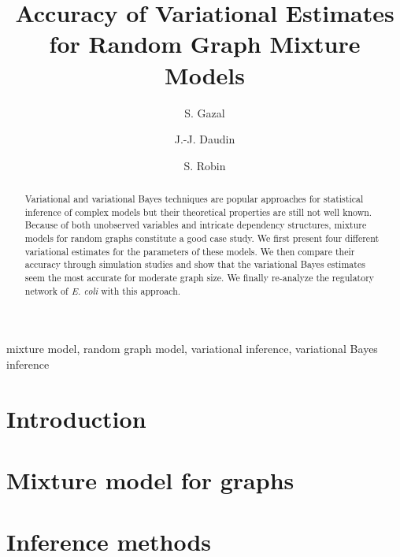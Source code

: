 \documentclass[authoryear]{elsarticle}
\title{Accuracy of Variational Estimates for Random Graph Mixture
  Models}
\author[Agro,INRA]{S. Gazal}
\author[Agro,INRA]{J.-J. Daudin}
\author[Agro,INRA]{S. Robin\corref{cor1}}
\date{}
\begin{document}

\begin{abstract}
  Variational and variational Bayes techniques are popular approaches
  for statistical inference of complex models but their theoretical
  properties are still not well known. Because of both unobserved
  variables and intricate dependency structures, mixture models for
  random graphs constitute a good case study. We first present four
  different variational estimates for the parameters of these models.
  We then compare their accuracy through simulation studies and show
  that the variational Bayes estimates seem the most accurate for
  moderate graph size. We finally re-analyze the regulatory network of
  {\it E. coli} with this approach.
\end{abstract}

\begin{keyword}
  mixture model, random graph model, variational inference,
  variational Bayes inference
\end{keyword}

\maketitle

\section{Introduction} \label{Sec:Intro}


 
\section{Mixture model for graphs} \label{Sec:Model}



\section{Inference methods} \label{Sec:Inference}
\end{document}
